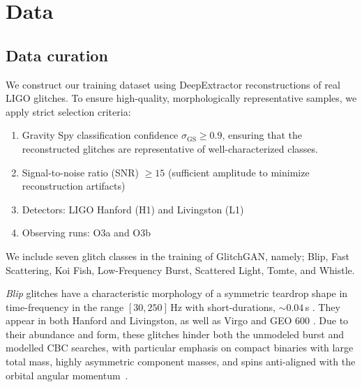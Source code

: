 \documentclass[reprint,nofootinbib,amsmath,amssymb,aps,floatfix]{revtex4-2}
\begin{document}

\vspace{-1mm}
\section{Data}
\label{sec:data}

\vspace{-1mm}

\subsection{Data curation}

We construct our training dataset using DeepExtractor reconstructions of real LIGO glitches.
To ensure high-quality, morphologically representative samples, we apply strict selection criteria:

\begin{enumerate}
\item
Gravity Spy classification confidence $\sigma_{\text{GS}} \geq 0.9$, ensuring that the reconstructed glitches are representative of well-characterized classes.

\item
Signal-to-noise ratio (SNR) $\geq 15$ (sufficient amplitude to minimize reconstruction artifacts)

\item
Detectors: LIGO Hanford (H1) and Livingston (L1)

\item
Observing runs: O3a and O3b


\end{enumerate}

We include seven glitch classes in the training of GlitchGAN, namely; Blip, Fast Scattering, Koi Fish, Low-Frequency Burst, Scattered Light, Tomte, and Whistle.

\textit{Blip} glitches have a characteristic morphology of a symmetric teardrop shape in time-frequency in the range $[30, 250]\,$Hz with short-durations, $\sim 0.04\,$s \cite{abbott2016characterization}. 
They appear in both Hanford and Livingston, as well as Virgo and GEO $600$ \cite{Cabero:2019orq}. 
Due to their abundance and form, these glitches hinder both the unmodeled burst and modelled CBC searches, with particular emphasis on compact binaries with large total mass, highly asymmetric component masses, and spins anti-aligned with the orbital angular momentum~\cite{abbott2018effects}.
\end{document}
